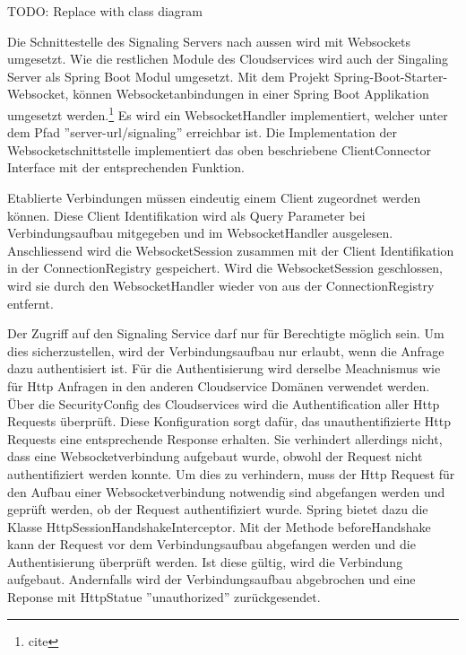 \clearpage

TODO: Replace with class diagram





\clearpage

Die Schnittestelle des Signaling Servers nach aussen wird mit Websockets umgesetzt.
Wie die restlichen Module des Cloudservices wird auch der Singaling Server als Spring Boot Modul umgesetzt.
Mit dem Projekt Spring-Boot-Starter-Websocket, können Websocketanbindungen in einer Spring Boot Applikation umgesetzt werden.\footnote{cite}
Es wird ein WebsocketHandler implementiert, welcher unter dem Pfad ''server-url/signaling'' erreichbar ist.
Die Implementation der Websocketschnittstelle implementiert das oben beschriebene ClientConnector Interface mit der entsprechenden Funktion.

Etablierte Verbindungen müssen eindeutig einem Client zugeordnet werden können.
Diese Client Identifikation wird als Query Parameter bei Verbindungsaufbau mitgegeben und im WebsocketHandler ausgelesen.
Anschliessend wird die WebsocketSession zusammen mit der Client Identifikation in der ConnectionRegistry gespeichert.
Wird die WebsocketSession geschlossen, wird sie durch den WebsocketHandler wieder von aus der ConnectionRegistry entfernt.

Der Zugriff auf den Signaling Service darf nur für Berechtigte möglich sein.
Um dies sicherzustellen, wird der Verbindungsaufbau nur erlaubt, wenn die Anfrage dazu authentisiert ist.
Für die Authentisierung wird derselbe Meachnismus wie für Http Anfragen in den anderen Cloudservice Domänen verwendet werden.
Über die SecurityConfig des Cloudservices wird die Authentification aller Http Requests überprüft.
Diese Konfiguration sorgt dafür, das unauthentifizierte Http Requests eine entsprechende Response erhalten.
Sie verhindert allerdings nicht, dass eine Websocketverbindung aufgebaut wurde, obwohl der Request nicht authentifiziert werden konnte.
Um dies zu verhindern, muss der Http Request für den Aufbau einer Websocketverbindung notwendig sind abgefangen werden und geprüft werden, ob der Request authentifiziert wurde.\cite{cite}
Spring bietet dazu die Klasse HttpSessionHandshakeInterceptor.
Mit der Methode beforeHandshake kann der Request vor dem Verbindungsaufbau abgefangen werden und die Authentisierung überprüft werden.
Ist diese gültig, wird die Verbindung aufgebaut.
Andernfalls wird der Verbindungsaufbau abgebrochen und eine Reponse mit HttpStatue ''unauthorized'' zurückgesendet.

